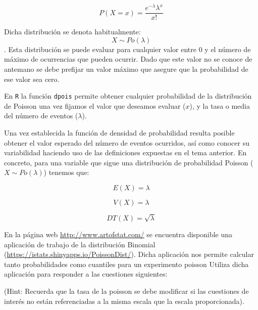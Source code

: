 \documentclass[
]{book}
\begin{document}
\begin{equation} 
  P(X = x) = \frac{e^{-\lambda} \lambda^x}{x!}
  \label{eq:probpois}
\end{equation}

Dicha distribución se denota habitualmente: \[ X \sim Po(\lambda)\]. Esta distribución se puede evaluar para cualquier valor entre 0 y el número de máximo de ocurrencias que pueden ocurrir. Dado que este valor no se conoce de antemano se debe prefijar un valor máximo que asegure que la probabilidad de ese valor sea cero.

En \texttt{R} la función \texttt{dpois} permite obtener cualquier probabilidad de la distribución de Poisson una vez fijamos el valor que deseamos evaluar (\(x\)), y la tasa o media del número de eventos (\(\lambda\)).

Una vez establecida la función de densidad de probabilidad resulta posible obtener el valor esperado del número de eventos ocurridos, así como conocer su variabilidad haciendo uso de las definiciones expuestas en el tema anterior. En concreto, para una variable que sigue una distribución de probabilidad Poisson (\(X \sim Po(\lambda)\)) tenemos que:

\begin{equation} 
  E(X) = \lambda
  \label{eq:meanpois}
\end{equation}

\begin{equation} 
  V(X) = \lambda
  \label{eq:varpois}
\end{equation}

\begin{equation} 
  DT(X) = \sqrt{\lambda}
  \label{eq:sdpois}
\end{equation}

En la página web \url{http://www.artofstat.com/} se encuentra disponible una aplicación de trabajo de la distribución Binomial (\url{https://istats.shinyapps.io/PoissonDist/}). Dicha aplicación nos permite calcular tanto probabilidades como cuantiles para un experimento poisson Utiliza dicha aplicación para responder a las cuestiones siguientes:

(Hint: Recuerda que la tasa de la poisson se debe modificar si las cuestiones de interés no están referenciadas a la misma escala que la escala proporcionada).
\end{document}

